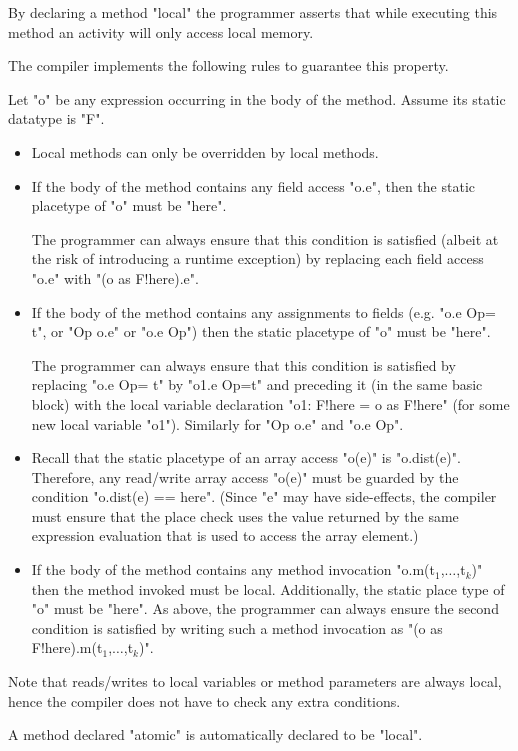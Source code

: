 By declaring a method \xcd"local" the programmer asserts that while
executing this method an activity will only access local memory.

The compiler implements the following rules to guarantee this property.

Let \xcd"o" be any expression occurring in the body of the
method. Assume its static datatype is \xcd"F". 

\begin{itemize}
\item Local methods can only be overridden by local methods. 

\item If the body of the method contains any field access \xcd"o.e", then
the static placetype of \xcd"o" must be \xcd"here". 

The programmer can always ensure that this condition is satisfied
(albeit at the risk of introducing a runtime exception) by replacing
each field access \xcd"o.e" with \xcd"(o as F!here).e".

\item If the body of the method contains any assignments to fields
(e.g. \xcd"o.e Op= t", or \xcd"Op o.e" or \xcd"o.e Op") then the
static placetype of \xcd"o" must be \xcd"here".

The programmer can always ensure that this condition is satisfied by
replacing \xcd"o.e Op= t" by \xcd"o1.e Op=t" and preceding it (in the
same basic block) with the local variable declaration \xcd"o1: F!here = o as F!here" (for some new local variable \xcd"o1"). Similarly for
\xcd"Op o.e" and \xcd"o.e Op".

\item Recall that the static placetype of an array access \xcd"o(e)"
is \xcd"o.dist(e)". Therefore, any read/write array access
\xcd"o(e)" must be guarded by the condition \xcd"o.dist(e) == here".  (Since  \xcd"e" may have side-effects, the compiler must
ensure that the place check uses the value returned by the same
expression evaluation that is used to access the array element.)

\item If the body of the method contains any method invocation
\xcdmath"o.m(t$_1$,$\dots$,t$_k$)" then the method invoked must be local. Additionally,
the static place type of \xcd"o" must be \xcd"here". 
As above, the programmer can always ensure the second
condition is satisfied by writing such a method invocation
as \xcdmath"(o as F!here).m(t$_1$,$\dots$,t$_k$)".
\end{itemize}

Note that reads/writes to local variables or method parameters are
always local, hence the compiler does not have to check any extra
conditions.

A method declared \xcd"atomic" is automatically declared
to be \xcd"local".
